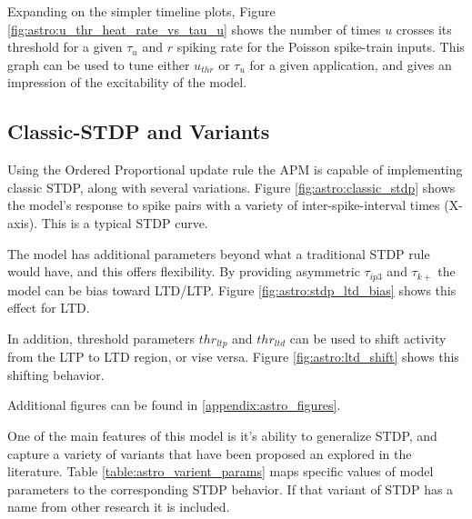     Expanding on the simpler timeline plots, Figure
    \ref{fig:astro:u_thr_heat_rate_vs_tau_u} shows the number of times $u$ crosses its
    threshold for a given $\tau_u$ and $r$ spiking rate for the Poisson
    spike-train inputs. This graph can be used to tune either $u_{thr}$ or
    $\tau_u$ for a given application, and gives an impression of the
    excitability of the model.

    \subsection{Classic-STDP and Variants} \label{sec:ordered_prop:stdp}
    
    Using the Ordered Proportional update rule the APM is capable of
    implementing classic STDP, along with several variations.  
    Figure \ref{fig:astro:classic_stdp} shows the model's response to spike
    pairs with a variety of inter-spike-interval times (X-axis). This is a
    typical STDP curve.


    The model has additional parameters beyond what a traditional STDP rule would
    have, and this offers flexibility. By providing asymmetric $\tau_{ip3}$ and
    $\tau_{k+}$ the model can be bias toward LTD/LTP. Figure
    \ref{fig:astro:stdp_ltd_bias} shows this effect for LTD.


    In addition, threshold parameters $thr_{ltp}$ and $thr_{ltd}$ can be used to
    shift activity from the LTP to LTD region, or vise versa. Figure
    \ref{fig:astro:ltd_shift} shows this shifting behavior.
    

    Additional figures can be found in \ref{appendix:astro_figures}.

    One of the main features of this model is it's ability to generalize STDP,
    and capture a variety of variants that have been proposed an explored in the
    literature. Table \ref{table:astro_varient_params} maps specific values of
    model parameters to the corresponding STDP behavior. If that
    variant of STDP has a name from other research it is included.


